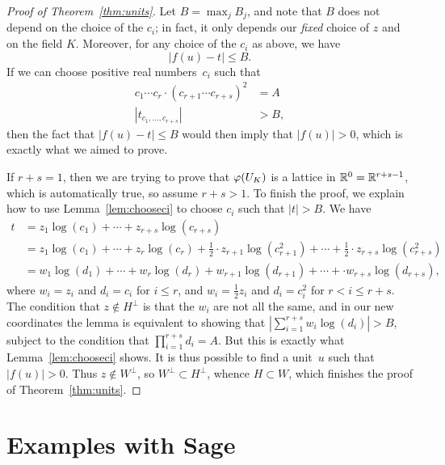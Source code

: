 \begin{proof}[Proof of Theorem~\ref{thm:units}]
Let $B=\max_{j} B_j$, and note that $B$ does not depend on the choice
of the $c_i$; in fact, it only depends our {\em fixed} choice of $z$ and on the field $K$.
Moreover, for any choice of the $c_i$ as above, we have
$$
  |f(u) - t| \leq B.
$$
If we can choose positive real numbers~$c_i$ such that
\begin{align*}
 c_1\cdots c_r\cdot (c_{r+1}\cdots c_{r+s})^2 &= A\\
  |t_{c_1,\ldots, c_{r+s}}| &>B,
\end{align*}
then the fact that $|f(u)-t|\leq B$ would then imply that $|f(u)|>0$,
which is exactly what we aimed to prove.

If $r+s=1$, then we are trying to prove that $\varphi(U_K)$ is a lattice
in $\mathbb{R}^0=\mathbb{R}^{r+s-1}$, which is automatically true, so assume $r+s>1$.
To finish the proof, we explain how to use Lemma~\ref{lem:chooseci}
to choose $c_i$ such that $|t|>B$.  We have
\begin{align*}
t &= z_1\log(c_1)+\cdots +z_{r+s}\log(c_{r+s})\\
&= z_1\log(c_1)+\cdots +  z_r\log(c_r)+
\frac{1}{2}\cdot z_{r+1}\log(c_{r+1}^2) +
\cdots + \frac{1}{2}\cdot z_{r+s}\log(c_{r+s}^2)\\
&=w_1\log(d_1)+\cdots +  w_r\log(d_r)+
w_{r+1}\log(d_{r+1}) +
\cdots +\cdot w_{r+s}\log(d_{r+s}),
\end{align*}
where $w_i=z_i$ and $d_i=c_i$ for $i\leq r$, and
$w_i=\frac{1}{2}z_i$ and $d_i=c_i^2$ for $r<i\leq r+s$.
The condition that $z\not\in H^{\perp}$ is that the $w_i$ are not all
the same,
 and in our new coordinates the lemma is equivalent to
showing that $|\sum_{i=1}^{r+s} w_i \log(d_i)|>B$, subject to the
condition that $\prod_{i=1}^{r+s} d_i = A$.
But this is exactly what Lemma~\ref{lem:chooseci} shows.
It is thus possible
to find a unit~$u$ such that $|f(u)|>0$.  Thus $z\not\in
W^{\perp}$, so $W^{\perp}\subset H^{\perp}$, whence $H\subset W$,
which finishes the proof of Theorem~\ref{thm:units}.
\end{proof}

\section{Examples with Sage}
